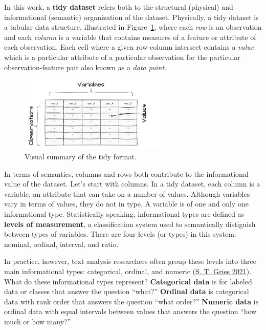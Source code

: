 \documentclass[
  letterpaper,
  DIV=11,
  numbers=noendperiod]{scrreport}
\theoremstyle{definition}
\theoremstyle{remark}
\begin{document}
In this work, a \textbf{tidy dataset} refers both to the structural
(physical) and informational (semantic) organization of the dataset.
Physically, a tidy dataset is a tabular data structure, illustrated in
Figure~\ref{fig-ud-tidy-format-image}, where each \emph{row} is an
observation and each \emph{column} is a variable that contains measures
of a feature or attribute of each observation. Each cell where a given
row-column intersect contains a \emph{value} which is a particular
attribute of a particular observation for the particular
observation-feature pair also known as a \emph{data point}.

\begin{figure}[H]

{\centering \includegraphics[width=2.76in,height=\textheight]{figures/ud-tidy.drawio.png}

}

\caption{\label{fig-ud-tidy-format-image}Visual summary of the tidy
format.}

\end{figure}

In terms of semantics, columns and rows both contribute to the
informational value of the dataset. Let's start with columns. In a tidy
dataset, each column is a variable, an attribute that can take on a
number of values. Although variables vary in terms of values, they do
not in type. A variable is of one and only one informational type.
Statistically speaking, informational types are defined as
\textbf{levels of measurement}, a classification system used to
semantically distiguish between types of variables. There are four
levels (or types) in this system: nominal, ordinal, interval, and ratio.

In practice, however, text analysis researchers often group these levels
into three main informational types: categorical, ordinal, and numeric
(\protect\hyperlink{ref-Gries2021a}{S. T. Gries 2021}). What do these
informational types represent? \textbf{Categorical data} is for labeled
data or classes that answer the question ``what?'' \textbf{Ordinal data}
is categorical data with rank order that answers the question ``what
order?'' \textbf{Numeric data} is ordinal data with equal intervals
between values that answers the question ``how much or how many?''
\end{document}
